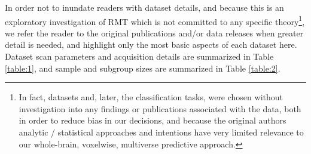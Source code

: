 \documentclass[12pt]{spieman}  %
\begin{document}
\begin{spacing}{2}
In order not to inundate readers with dataset details, and because this is an
exploratory investigation of RMT which is not committed to any specific
theory\footnote{In fact, datasets and, later, the classification tasks, were
chosen without investigation into any findings or publications associated with
the data, both in order to reduce bias in our decisions, and because the
original authors analytic / statistical approaches and intentions have very
limited relevance to our whole-brain, voxelwise, multiverse predictive
approach.}, we refer the reader to the original publications and/or data
releases when greater detail is needed, and highlight only the most basic
aspects of each dataset here.  Dataset scan parameters and acquisition details
are summarized in Table \ref{table:1}, and sample and subgroup sizes are
summarized in Table \ref{table:2}.


\end{spacing}
\end{document}
